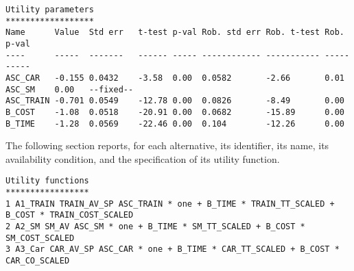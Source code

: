 \documentclass[12pt,a4paper]{article}
\begin{document}
\begin{lstlisting}[style=tiny]
Utility parameters
******************
Name      Value  Std err   t-test p-val Rob. std err Rob. t-test Rob. p-val 
----      -----  -------   ------ ----- ------------ ----------- ---------- 
ASC_CAR   -0.155 0.0432    -3.58  0.00  0.0582       -2.66       0.01       
ASC_SM    0.00   --fixed--                                                  
ASC_TRAIN -0.701 0.0549    -12.78 0.00  0.0826       -8.49       0.00       
B_COST    -1.08  0.0518    -20.91 0.00  0.0682       -15.89      0.00       
B_TIME    -1.28  0.0569    -22.46 0.00  0.104        -12.26      0.00       
\end{lstlisting}

The following section  reports, for each alternative, its identifier, its name, its availability condition, and the specification of its utility
function.

\begin{lstlisting}[style=tiny]
Utility functions
*****************
1 A1_TRAIN TRAIN_AV_SP ASC_TRAIN * one + B_TIME * TRAIN_TT_SCALED + B_COST * TRAIN_COST_SCALED
2 A2_SM	SM_AV ASC_SM * one + B_TIME * SM_TT_SCALED + B_COST * SM_COST_SCALED
3 A3_Car CAR_AV_SP ASC_CAR * one + B_TIME * CAR_TT_SCALED + B_COST * CAR_CO_SCALED
\end{lstlisting}
\end{document}
